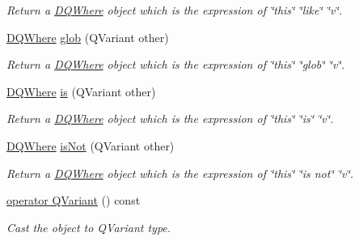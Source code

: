 \begin{DoxyCompactItemize}
\begin{DoxyCompactList}\small\item\em Return a \hyperlink{classDQWhere}{DQWhere} object which is the expression of \char`\"{}this\char`\"{} \char`\"{}like\char`\"{} \char`\"{}v\char`\"{}. \item\end{DoxyCompactList}\item 
\hypertarget{classDQWhere_ada79f6bdf12848df480fd63d1b1c39e1}{
\hyperlink{classDQWhere}{DQWhere} \hyperlink{classDQWhere_ada79f6bdf12848df480fd63d1b1c39e1}{glob} (QVariant other)}
\label{classDQWhere_ada79f6bdf12848df480fd63d1b1c39e1}

\begin{DoxyCompactList}\small\item\em Return a \hyperlink{classDQWhere}{DQWhere} object which is the expression of \char`\"{}this\char`\"{} \char`\"{}glob\char`\"{} \char`\"{}v\char`\"{}. \item\end{DoxyCompactList}\item 
\hypertarget{classDQWhere_ab2fb538cdd6e22d97b8bbce5e7e7ff9b}{
\hyperlink{classDQWhere}{DQWhere} \hyperlink{classDQWhere_ab2fb538cdd6e22d97b8bbce5e7e7ff9b}{is} (QVariant other)}
\label{classDQWhere_ab2fb538cdd6e22d97b8bbce5e7e7ff9b}

\begin{DoxyCompactList}\small\item\em Return a \hyperlink{classDQWhere}{DQWhere} object which is the expression of \char`\"{}this\char`\"{} \char`\"{}is\char`\"{} \char`\"{}v\char`\"{}. \item\end{DoxyCompactList}\item 
\hypertarget{classDQWhere_a923de2057c039abac7f8dd149cbacbb5}{
\hyperlink{classDQWhere}{DQWhere} \hyperlink{classDQWhere_a923de2057c039abac7f8dd149cbacbb5}{isNot} (QVariant other)}
\label{classDQWhere_a923de2057c039abac7f8dd149cbacbb5}

\begin{DoxyCompactList}\small\item\em Return a \hyperlink{classDQWhere}{DQWhere} object which is the expression of \char`\"{}this\char`\"{} \char`\"{}is not\char`\"{} \char`\"{}v\char`\"{}. \item\end{DoxyCompactList}\item 
\hypertarget{classDQWhere_af0bc75176011da1bb09735047f6b752a}{
\hyperlink{classDQWhere_af0bc75176011da1bb09735047f6b752a}{operator QVariant} () const }
\label{classDQWhere_af0bc75176011da1bb09735047f6b752a}

\begin{DoxyCompactList}\small\item\em Cast the object to QVariant type. \item\end{DoxyCompactList}\end{DoxyCompactItemize}


